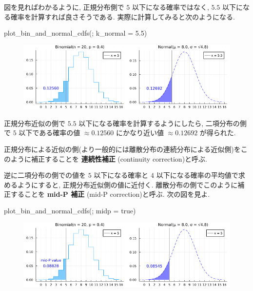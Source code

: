 \documentclass[
  letterpaper,
  DIV=11,
  numbers=noendperiod]{scrartcl}
\newenvironment{Shaded}{\begin{snugshade}}{\end{snugshade}}
\newcommand{\ConstantTok}[1]{\textcolor[rgb]{0.56,0.35,0.01}{#1}}
\newcommand{\FloatTok}[1]{\textcolor[rgb]{0.68,0.00,0.00}{#1}}
\newcommand{\FunctionTok}[1]{\textcolor[rgb]{0.28,0.35,0.67}{#1}}
\newcommand{\NormalTok}[1]{\textcolor[rgb]{0.00,0.23,0.31}{#1}}
\newcommand{\OperatorTok}[1]{\textcolor[rgb]{0.37,0.37,0.37}{#1}}
\begin{document}
図を見ればわかるように, 正規分布側で \(5\) 以下になる確率ではなく,
\(5.5\) 以下になる確率を計算すれば良さそうである.
実際に計算してみると次のようになる.

\begin{Shaded}
\begin{Highlighting}[]
\FunctionTok{plot\_bin\_and\_normal\_cdfs}\NormalTok{(; k\_normal }\OperatorTok{=} \FloatTok{5.5}\NormalTok{)}
\end{Highlighting}
\end{Shaded}

\begin{figure}[H]

{\centering \includegraphics{05 Central limit theorem_files/figure-pdf/cell-61-output-1.png}

}

\end{figure}

正規分布近似の側で \(5.5\) 以下になる確率を計算するようにしたら,
二項分布の側で \(5\) 以下である確率の値 \(\approx 0.12560\)
にかなり近い値 \(\approx 0.12692\) が得られた.

正規分布による近似の側(より一般的には離散分布の連続分布による近似側)をこのように補正することを
\textbf{連続性補正} (continuity correction)と呼ぶ.

逆に二項分布の側での値を \(5\) 以下になる確率と \(4\)
以下になる確率の平均値で求めるようにすると, 正規分布近似側の値に近付く.
離散分布の側でこのように補正することを \textbf{mid-P 補正} (mid-P
correction)と呼ぶ. 次の図を見よ.

\begin{Shaded}
\begin{Highlighting}[]
\FunctionTok{plot\_bin\_and\_normal\_cdfs}\NormalTok{(; midp }\OperatorTok{=} \ConstantTok{true}\NormalTok{)}
\end{Highlighting}
\end{Shaded}

\begin{figure}[H]

{\centering \includegraphics{05 Central limit theorem_files/figure-pdf/cell-62-output-1.png}

}

\end{figure}
\end{document}
